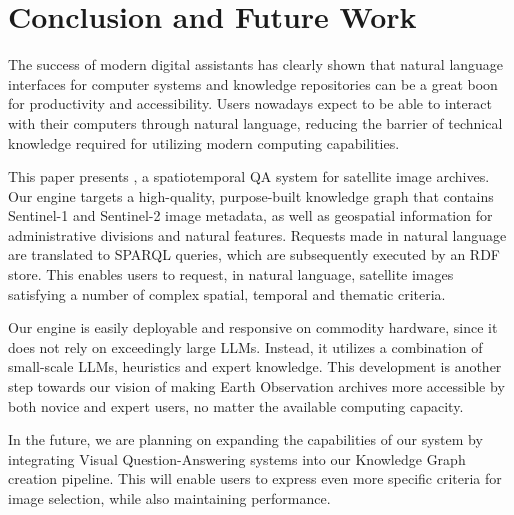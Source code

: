 \section{Conclusion and Future Work}
\label{sec:conclusion}

The success of modern digital assistants has clearly shown that natural language interfaces for computer systems and knowledge repositories can be a great boon for productivity and accessibility. Users nowadays expect to be able to interact with their computers through natural language, reducing the barrier of technical knowledge required for utilizing modern computing capabilities.

This paper presents \EngineName{}, a spatiotemporal QA system for satellite image archives. Our engine targets a high-quality, purpose-built knowledge graph that contains Sentinel-1 and Sentinel-2 image metadata, as well as geospatial information for administrative divisions and natural features. Requests made in natural language are translated to SPARQL queries, which are subsequently executed by an RDF store. This enables users to request, in natural language, satellite images satisfying a number of complex spatial, temporal and thematic criteria. 

Our engine is easily deployable and responsive on commodity hardware, since it does not rely on exceedingly large LLMs. Instead, it utilizes a combination of small-scale LLMs, heuristics and expert knowledge. This development is another step towards our vision of making Earth Observation archives more accessible by both novice and expert users, no matter the available computing capacity.

In the future, we are planning on expanding the capabilities of our system by integrating Visual Question-Answering systems into our Knowledge Graph creation pipeline. This will enable users to express even more specific criteria for image selection, while also maintaining performance.